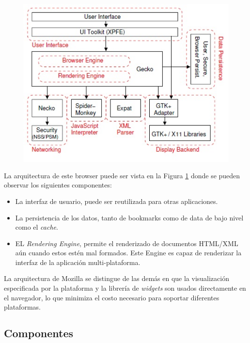         \begin{figure}[h!t]
		    \begin{center}
				\includegraphics[scale=0.8]{figures/archMoz.jpg}
		      \label{fig:archM}
		    \end{center}
		\end{figure}
        
        La arquitectura de este browser puede ser vista en la Figura \ref{fig:archM} donde se pueden observar los siguientes componentes:
        \begin{itemize}
            \item La interfaz de usuario, puede ser reutilizada para otras aplicaciones.
            \item La persistencia de los datos, tanto de bookmarks como de data de bajo nivel como el \textit{cache}.
            \item EL \textit{Rendering Engine}, permite el renderizado de documentos HTML/XML aún cuando estos estén mal formados. Este Engine es capaz de renderizar la interfaz de la aplicación multi-plataforma.
        \end{itemize}
        La arquitectura de Mozilla se distingue de las demás en que la visualización especificada por la plataforma y la librería de \textit{widgets} son usados directamente en el navegador, lo que minimiza el costo necesario para soportar diferentes plataformas.
        
\subsection{Componentes}

